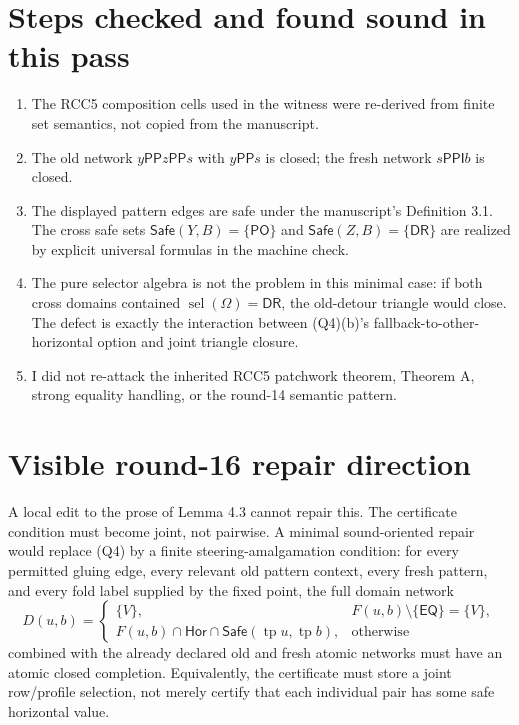 \documentclass[11pt]{article}
\newcommand{\EQ}{\mathsf{EQ}}
\newcommand{\PP}{\mathsf{PP}}
\newcommand{\PPI}{\mathsf{PPI}}
\newcommand{\PO}{\mathsf{PO}}
\newcommand{\DR}{\mathsf{DR}}
\newcommand{\Safe}{\mathsf{Safe}}
\newcommand{\sel}{\operatorname{sel}}
\newcommand{\Hor}{\mathsf{Hor}}
\newcommand{\U}{\Omega}
\begin{document}
\section{Steps checked and found sound in this pass}

\begin{enumerate}[leftmargin=2em]
\item The RCC5 composition cells used in the witness were re-derived from
finite set semantics, not copied from the manuscript.
\item The old network $y\PP z\PP s$ with $y\PP s$ is closed; the fresh
network $s\PPI b$ is closed.
\item The displayed pattern edges are safe under the manuscript's
Definition 3.1.  The cross safe sets $\Safe(Y,B)=\{\PO\}$ and
$\Safe(Z,B)=\{\DR\}$ are realized by explicit universal formulas in the
machine check.
\item The pure selector algebra is not the problem in this minimal case:
if both cross domains contained $\sel(\U)=\DR$, the old-detour triangle
would close.  The defect is exactly the interaction between (Q4)(b)'s
fallback-to-other-horizontal option and joint triangle closure.
\item I did not re-attack the inherited RCC5 patchwork theorem, Theorem A,
strong equality handling, or the round-14 semantic pattern.
\end{enumerate}

\section{Visible round-16 repair direction}

A local edit to the prose of Lemma 4.3 cannot repair this.  The certificate
condition must become joint, not pairwise.  A minimal sound-oriented repair
would replace (Q4) by a finite steering-amalgamation condition: for every
permitted gluing edge, every relevant old pattern context, every fresh
pattern, and every fold label supplied by the fixed point, the full domain
network
\[
  D(u,b)=
  \begin{cases}
    \{V\}, & F(u,b)\setminus\{\EQ\}=\{V\},\\
    F(u,b)\cap\Hor\cap\Safe(\operatorname{tp}u,\operatorname{tp}b),
       & \text{otherwise}
  \end{cases}
\]
combined with the already declared old and fresh atomic networks must have
an atomic closed completion.  Equivalently, the certificate must store a
joint row/profile selection, not merely certify that each individual pair
has some safe horizontal value.
\end{document}
